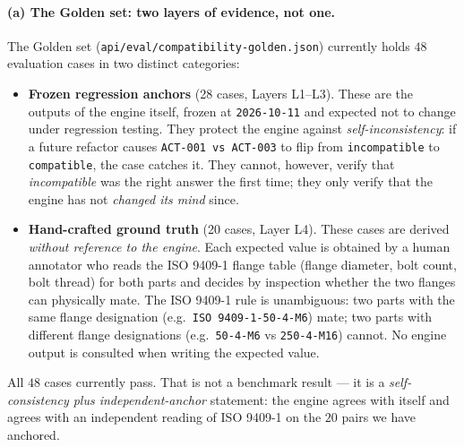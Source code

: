 \documentclass[11pt,twocolumn]{article}
\begin{document}
\paragraph{(a) The Golden set: two layers of evidence, not one.}
The Golden set (\texttt{api/eval/compatibility-golden.json})
currently holds $48$ evaluation cases in two distinct categories:

\begin{itemize}[nosep,leftmargin=*]
\item \textbf{Frozen regression anchors} (28 cases, Layers L1--L3).
These are the outputs of the engine itself, frozen at
\texttt{2026-10-11} and expected not to change under regression
testing. They protect the engine against \emph{self-inconsistency}:
if a future refactor causes \texttt{ACT-001 vs ACT-003} to flip from
\texttt{incompatible} to \texttt{compatible}, the case catches it.
They cannot, however, verify that \emph{incompatible} was the right
answer the first time; they only verify that the engine has not
\emph{changed its mind} since.
\item \textbf{Hand-crafted ground truth} (20 cases, Layer L4).
These cases are derived \emph{without reference to the engine}. Each
expected value is obtained by a human annotator who reads the ISO
9409-1 flange table (flange diameter, bolt count, bolt thread) for
both parts and decides by inspection whether the two flanges can
physically mate. The ISO 9409-1 rule is unambiguous: two parts with
the same flange designation (e.g.\ \texttt{ISO 9409-1-50-4-M6})
mate; two parts with different flange designations (e.g.\
\texttt{50-4-M6} vs \texttt{250-4-M16}) cannot. No engine output is
consulted when writing the expected value.
\end{itemize}

All $48$ cases currently pass. That is not a benchmark result --- it
is a \emph{self-consistency plus independent-anchor} statement: the
engine agrees with itself and agrees with an independent reading of
ISO 9409-1 on the $20$ pairs we have anchored.
\end{document}
